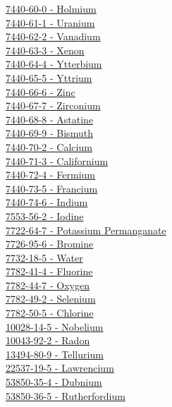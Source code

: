 \begin{multicols}{2}
\hyperref[sec:elem-holmium]{7440-60-0 - Holmium}\\
\hyperref[sec:elem-uranium]{7440-61-1 - Uranium}\\
\hyperref[sec:elem-vanadium]{7440-62-2 - Vanadium}\\
\hyperref[sec:elem-xenon]{7440-63-3 - Xenon}\\
\hyperref[sec:elem-ytterbium]{7440-64-4 - Ytterbium}\\
\hyperref[sec:elem-yttrium]{7440-65-5 - Yttrium}\\
\hyperref[sec:elem-zinc]{7440-66-6 - Zinc}\\
\hyperref[sec:elem-zirconium]{7440-67-7 - Zirconium}\\
\hyperref[sec:elem-astatine]{7440-68-8 - Astatine}\\
\hyperref[sec:elem-bismuth]{7440-69-9 - Bismuth}\\
\hyperref[sec:elem-calcium]{7440-70-2 - Calcium}\\
\hyperref[sec:elem-californium]{7440-71-3 - Californium}\\
\hyperref[sec:elem-fermium]{7440-72-4 - Fermium}\\
\hyperref[sec:elem-francium]{7440-73-5 - Francium}\\
\hyperref[sec:elem-indium]{7440-74-6 - Indium}\\
\hyperref[sec:elem-iodine]{7553-56-2 - Iodine}\\
\hyperref[sec:chem-7722-64-7]{7722-64-7 - Potassium Permanganate}\\
\hyperref[sec:elem-bromine]{7726-95-6 - Bromine}\\
\hyperref[sec:chem-7732-18-5]{7732-18-5 - Water}\\
\hyperref[sec:elem-fluorine]{7782-41-4 - Fluorine}\\
\hyperref[sec:elem-oxygen]{7782-44-7 - Oxygen}\\
\hyperref[sec:elem-selenium]{7782-49-2 - Selenium}\\
\hyperref[sec:elem-chlorine]{7782-50-5 - Chlorine}\\
\hyperref[sec:elem-nobelium]{10028-14-5 - Nobelium}\\
\hyperref[sec:elem-radon]{10043-92-2 - Radon}\\
\hyperref[sec:elem-tellurium]{13494-80-9 - Tellurium}\\
\hyperref[sec:elem-lawrencium]{22537-19-5 - Lawrencium}\\
\hyperref[sec:elem-dubnium]{53850-35-4 - Dubnium}\\
\hyperref[sec:elem-rutherfordium]{53850-36-5 - Rutherfordium}\\

\end{multicols}

